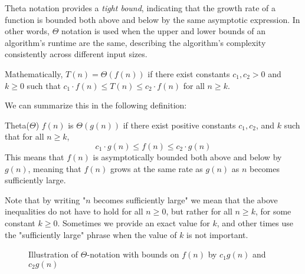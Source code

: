Theta notation provides a \textit{tight bound}, indicating that the growth rate of a function is bounded both above and below by the same asymptotic expression. In other words, $\Theta$ notation is used when the upper and lower bounds of an algorithm’s runtime are the same, describing the algorithm’s complexity consistently across different input sizes.

Mathematically, $T(n) = \Theta(f(n))$ if there exist constants $c_1, c_2 > 0$ and $k \geq 0$ such that $c_1 \cdot f(n) \leq T(n) \leq c_2 \cdot f(n)$ for all $n \geq k$.

We can summarize this in the following definition:

\begin{definition}{Theta(\(\Theta\))}
    $f(n)$ is $\Theta(g(n))$ if there exist positive constants $c_1, c_2$, and $k$ such that for all $n \geq k$,
    \medskip
    \[
    c_1 \cdot g(n) \leq f(n) \leq c_2 \cdot g(n)
    \]
    \medskip
This means that $f(n)$ is asymptotically bounded both above and below by $g(n)$, meaning that $f(n)$ grows at the same rate as $g(n)$ as $n$ becomes sufficiently large.
\label{def:theta_notation}
\end{definition}

Note that by writing "$n$ becomes sufficiently large" we mean that the above inequalities do not have to hold for all $n \geq 0$, but rather for all $n \geq k$, for some constant $k \geq 0$. Sometimes we provide an exact value for $k$, and other times use the "sufficiently large" phrase when the value of $k$ is not important.

\begin{figure}[h]
    \centering
    \caption{Illustration of \(\Theta\)-notation with bounds on \( f(n) \) by \( c_1 g(n) \) and \( c_2 g(n) \)}
    \label{fig:theta_notation}
\end{figure}

